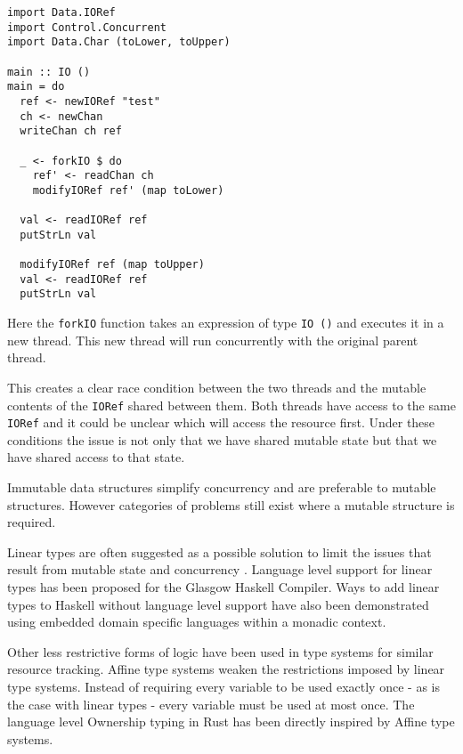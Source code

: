 \documentclass[onehalf,11pt]{beavtex}
\begin{document}
\begin{verbatim}
import Data.IORef
import Control.Concurrent
import Data.Char (toLower, toUpper)

main :: IO ()
main = do
  ref <- newIORef "test"
  ch <- newChan
  writeChan ch ref

  _ <- forkIO $ do
    ref' <- readChan ch
    modifyIORef ref' (map toLower)

  val <- readIORef ref
  putStrLn val

  modifyIORef ref (map toUpper)
  val <- readIORef ref
  putStrLn val
\end{verbatim}

Here the \texttt{forkIO} function takes an expression of type \texttt{IO ()}
and executes it in a new thread.
This new thread will run concurrently with the original parent thread.

This creates a clear race condition between the two threads and the mutable
contents of the \texttt{IORef} shared between them.
Both threads have access to the same \texttt{IORef} and it could be unclear
which will access the resource first. Under these conditions the issue is not
only that we have shared mutable state but that we have shared access to that
state.


Immutable data structures simplify concurrency and are preferable to
mutable structures. However categories of problems still exist where a
mutable structure is required.

Linear types are often suggested as a possible solution to limit the issues that
result from mutable state \cite{Wadler90lineartypes} and concurrency
\cite{caires2010session}.  Language level support for linear types has been
proposed for the Glasgow Haskell Compiler. \cite{LinearTypesGHC}
Ways to add linear types to Haskell without language level support have also
been demonstrated using embedded domain specific languages within a monadic
context. \cite{Paykin:2017:LM:3122955.3122965}

Other less restrictive forms of logic have been used in type systems for similar
resource tracking.
Affine type systems weaken the restrictions imposed by linear type systems.
Instead of requiring every variable to be used exactly once - as is the case
with linear types - every variable must be used at most once.
The language level Ownership typing in Rust has been directly inspired by Affine
type systems. %
\end{document}
